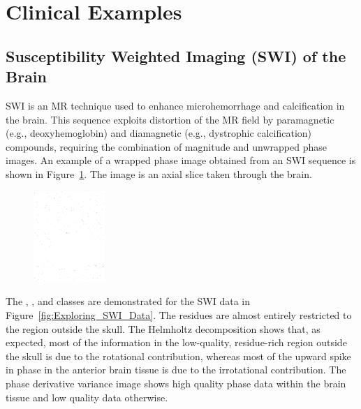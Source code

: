 \section{Clinical Examples}

\subsection{Susceptibility Weighted Imaging (SWI) of the Brain}

SWI is an MR technique used to enhance microhemorrhage and calcification in the brain.  This sequence exploits distortion of the MR field by paramagnetic (e.g., deoxyhemoglobin) and diamagnetic (e.g., dystrophic calcification) compounds, requiring the combination of magnitude and unwrapped phase images.  An example of a wrapped phase image obtained from an SWI sequence is shown in Figure~\ref{fig:SWI}.  The image is an axial slice taken through the brain.

\begin{figure}[h]
\center
\includegraphics[width=0.24\textwidth]{images/input/wrapped_swi.png}

\label{fig:SWI}
\end{figure}

The , , and  classes are demonstrated for the SWI data in Figure~\ref{fig:Exploring_SWI_Data}.  The residues are almost entirely restricted to the region outside the skull.  The Helmholtz decomposition shows that, as expected, most of the information in the low-quality, residue-rich region outside the skull is due to the rotational contribution, whereas most of the upward spike in phase in the anterior brain tissue is due to the irrotational contribution.  The phase derivative variance image shows high quality phase data within the brain tissue and low quality data otherwise.

